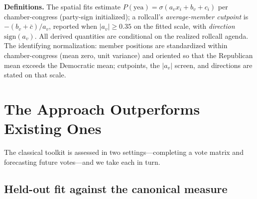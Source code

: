 \documentclass[12pt]{article}
\begin{document}
\textbf{Definitions.} The spatial fits estimate $P(\text{yea}) =
\sigma(a_v x_i + b_v + c_i)$ per chamber-congress (party-sign
initialized); a rollcall's \emph{average-member cutpoint} is
$-(b_v + \bar c)/a_v$, reported when $|a_v| \geq 0.35$ on the fitted
scale, with \emph{direction} $\mathrm{sign}(a_v)$. All derived
quantities are conditional on the realized rollcall agenda. The
identifying normalization: member positions are standardized within
chamber-congress (mean zero, unit variance) and oriented so that the
Republican mean exceeds the Democratic mean; cutpoints, the
$|a_v|$ screen, and directions are stated on that scale.

\section{The Approach Outperforms Existing Ones}
\label{sec:outperform}

The classical toolkit is assessed in two settings---completing a vote
matrix and forecasting future votes---and we take each in turn.

\subsection{Held-out fit against the canonical measure}
\end{document}
